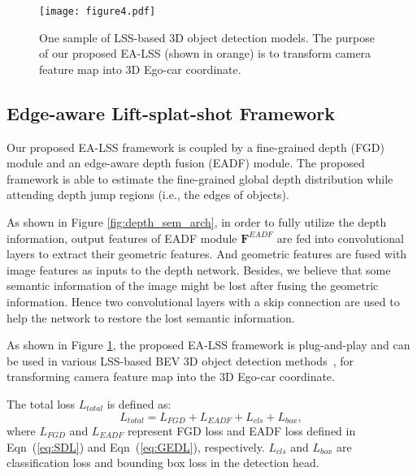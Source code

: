 \documentclass[letterpaper]{article} \usepackage[submission]{aaai24}  \usepackage{times}  \usepackage{helvet}  \usepackage{courier}  \usepackage[hyphens]{url}  \usepackage{graphicx} \urlstyle{rm} \def\UrlFont{\rm}  \usepackage{natbib}  \usepackage{caption} \frenchspacing  \setlength{\pdfpagewidth}{8.5in} \setlength{\pdfpageheight}{11in} \usepackage{algorithm}
\begin{document}
\begin{figure}[t]
\begin{center}
\texttt{[image: figure4.pdf]}
\end{center}
   \caption{One sample of LSS-based 3D object detection models. The purpose of our proposed EA-LSS (shown in orange) is to transform camera feature map into 3D Ego-car coordinate. } \label{fig:bev_arch}
\end{figure}
\subsection{Edge-aware Lift-splat-shot Framework}
Our proposed EA-LSS framework is coupled by a fine-grained depth (FGD) module and an edge-aware depth fusion (EADF) module. The proposed framework is able to estimate the fine-grained global depth distribution while attending depth jump regions (i.e., the edges of objects). 

As shown in Figure \ref{fig:depth_sem_arch}, in order to fully utilize the depth information, output features of EADF module $\mathbf{F}^{EADF}$ are fed into convolutional layers to extract their geometric features. And geometric features are fused with image features as inputs to the depth network. 
Besides, we believe that some semantic information of the image might be lost after fusing the geometric information. Hence two convolutional layers with a skip connection are used to help the network to restore the lost semantic information.

As shown in Figure \ref{fig:bev_arch}, the proposed EA-LSS framework is plug-and-play and can be used in various LSS-based BEV 3D object detection methods~\cite{huang2021bevdet,liang2022bevfusion, CaDDN, li2022bevdepth}, for transforming camera feature map into the 3D Ego-car coordinate. 


The total loss $L_{total}$ is defined as: 
\begin{equation}
\label{eq:L_total}
L_{total} = L_{FGD}+L_{EADF}+L_{cls}+L_{box},
\end{equation}
where $L_{FGD}$ and $L_{EADF}$ represent FGD loss and EADF loss defined in Eqn~(\ref{eq:SDL}) and Eqn~(\ref{eq:GEDL}), respectively.  $L_{cls}$ and $L_{box}$ are classification loss and bounding box loss in the detection head.
\end{document}
